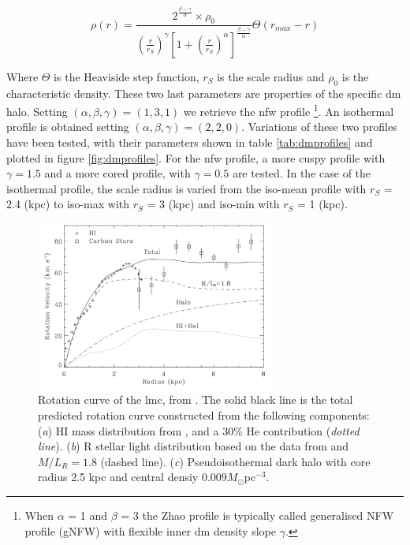 \documentclass[main.tex]{subfiles}
\begin{document}
\begin{equation}
    \rho(r) = \frac{2^{\frac{\beta-\gamma}{\alpha}} \times \rho_{0}}{\left(\frac{r}{r_{S}}\right)^{\gamma}\left[ 1+\left(\frac{r}{r_{S}} \right)^{\alpha}\right]^{\frac{\beta-\gamma}{\alpha}}}\Theta(r_{max}-r)
\end{equation} \label{fig:gnfw}

Where $\Theta$ is the Heaviside step function, $r_{S}$ is the scale radius and $\rho_{0}$ is the characteristic density. These two last parameters are properties of the specific \gls{dm} halo. Setting $(\alpha,\beta,\gamma) = (1,3,1)$ we retrieve the \gls{nfw} profile \cite{NFW} \footnote{When $\alpha$ = 1 and $\beta$ = 3 the Zhao profile is typically called generalised NFW profile (gNFW) with flexible inner \gls{dm} density slope $\gamma$.}. An isothermal profile is obtained setting $(\alpha,\beta,\gamma) = (2,2,0)$. Variations of these two profiles have been tested, with their parameters shown in table \ref{tab:dmprofiles} and plotted in figure \ref{fig:dmprofiles}. For the \gls{nfw} profile, a more cuspy profile with $\gamma=1.5$ and a more cored profile, with $\gamma=0.5$ are tested. In the case of the isothermal profile, the scale radius is varied from the iso-mean profile with $r_{S}$ = 2.4 (kpc) to iso-max with $r_{S}$ = 3 (kpc) and iso-min with $r_{S}$ = 1 (kpc).

\begin{figure}[h!]
  \centering
  \includegraphics[width=0.7\textwidth]{Pictures/rotationcurvelmc.pdf}
  \caption{\label{fig:rotcurve} Rotation curve of the \gls{lmc}, from \cite{LMCHI}. The solid black line is the total predicted rotation curve constructed from the following components: (\textit{a}) HI mass distribution from \cite{1992gasLMC}, and a 30\% He contribution (\textit{dotted line}). (\textit{b}) R stellar light distribution based on the data from \cite{1958starsinLMC} and $M/L_{R}=1.8$ (dashed line). (\textit{c}) Pseudoisothermal dark halo with core radius 2.5 kpc and central densiy $0.009 M_{\odot}$pc$^{-3}$.}
\end{figure}
\end{document}
